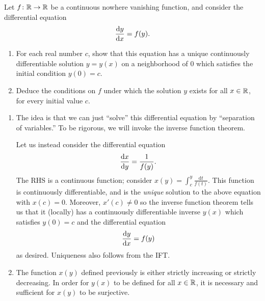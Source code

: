 \begin{problem}
	Let $f\colon \mathbb{R}\to\mathbb{R}$ be a continuous nowhere vanishing function, and consider the differential equation
	\[
		\deriv[x][y] = f(y).
	\]
	\begin{enumerate}
		\item For each real number $c$, show that this equation has a unique continuously differentiable solution $y=y(x)$ on a neighborhood of $0$ which satisfies the initial condition $y(0) = c$.
		\item Deduce the conditions on $f$ under which the solution $y$ exists for all $x\in \mathbb{R}$, for every initial value $c$.
	\end{enumerate}
\end{problem}
\begin{solution}\hfill
	\begin{enumerate}
		\item The idea is that we can just ``solve'' this differential equation by ``separation of variables.'' To be rigorous, we will invoke the inverse function theorem.
		
		Let us instead consider the differential equation
		\[
			\deriv[y][x] = \frac{1}{f(y)}.
		\]
		The RHS is a continuous function; consider $x(y) = \int_c^y \frac{\mathrm{d}t}{f(t)}$. This function is continuously differentiable, and is the \emph{unique} solution to the above equation with $x(c)=0$. Moreover, $x'(c) \neq 0$ so the inverse function theorem tells us that it (locally) has a continuously differentiable inverse $y(x)$ which satisfies $y(0) = c$ and the differential equation
		\[
			\deriv[x][y] = f(y)
		\]
		as desired. Uniqueness also follows from the IFT.
		\item The function $x(y)$ defined previously is either strictly increasing or strictly decreasing. In order for $y(x)$ to be defined for all $x\in \mathbb{R}$, it is necessary and sufficient for $x(y)$ to be surjective.
	\end{enumerate}
\end{solution}

